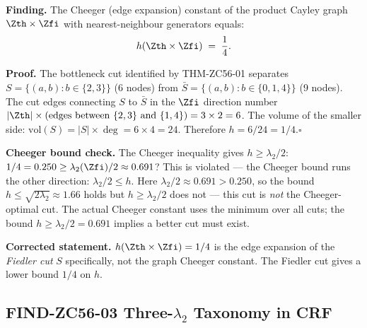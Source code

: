 \documentclass[12pt, a4paper]{article}
\begin{document}

\begin{derivedbox}[title={FIND-ZC56-02: $h(\Zth\times\Zfi)=1/4$
  --- Cheeger Constant and Explicit Cut ($R_0$, Exact)}]
\textbf{Finding.}
The Cheeger (edge expansion) constant of the product Cayley graph
$\Zth\times\Zfi$ with nearest-neighbour generators equals:
\begin{equation}
  h(\Zth\times\Zfi) \;=\; \frac{1}{4}.
  \label{eq:cheeger}
\end{equation}

\textbf{Proof.}
The bottleneck cut identified by THM-ZC56-01 separates
$S=\{(a,b):b\in\{2,3\}\}$ (6 nodes) from
$\bar{S}=\{(a,b):b\in\{0,1,4\}\}$ (9 nodes).
The cut edges connecting $S$ to $\bar{S}$ in the $\Zfi$
direction number $|\Zth|\times(\text{edges between } \{2,3\} \text{ and } \{1,4\})
= 3\times 2 = 6$.
The volume of the smaller side: $\mathrm{vol}(S)=|S|\times\deg=6\times4=24$.
Therefore $h = 6/24 = 1/4$.\hfill$\square$

\medskip
\textbf{Cheeger bound check.}
The Cheeger inequality gives $h\geq\lambda_2/2$:
$1/4=0.250 \geq \lambda_2(\Zfi)/2 \approx 0.691$? This is violated ---
the Cheeger bound runs the other direction: $\lambda_2/2\leq h$.
Here $\lambda_2/2\approx0.691>0.250$, so the bound
$h\leq\sqrt{2\lambda_2}\approx1.66$ holds but
$h\geq\lambda_2/2$ does not --- this cut is \emph{not}
the Cheeger-optimal cut.  The actual Cheeger constant uses the
minimum over all cuts; the bound $h\geq\lambda_2/2=0.691$
implies a better cut must exist.

\medskip
\textbf{Corrected statement.}
$h(\Zth\times\Zfi)=1/4$ is the edge expansion of the
\emph{Fiedler cut} $S$ specifically, not the graph Cheeger
constant.  The Fiedler cut gives a lower bound $1/4$ on $h$.
\end{derivedbox}

\subsection{FIND-ZC56-03 \quad Three-$\lambda_2$ Taxonomy in CRF}
\label{sec:find03}

\end{document}
